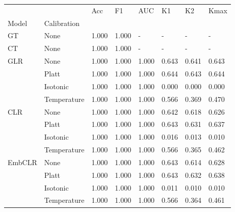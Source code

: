 \begin{tabular}{llllllll}
\toprule
 &  & Acc & F1 & AUC & K1 & K2 & Kmax \\
Model & Calibration &  &  &  &  &  &  \\
\midrule
GT & None & 1.000 & 1.000 & - & - & - & - \\
\cline{1-8}
CT & None & 1.000 & 1.000 & - & - & - & - \\
\cline{1-8}
\multirow[t]{4}{*}{GLR} & None & 1.000 & 1.000 & 1.000 & 0.643 & 0.641 & 0.643 \\
 & Platt & 1.000 & 1.000 & 1.000 & 0.644 & 0.643 & 0.644 \\
 & Isotonic & 1.000 & 1.000 & 1.000 & 0.000 & 0.000 & 0.000 \\
 & Temperature & 1.000 & 1.000 & 1.000 & 0.566 & 0.369 & 0.470 \\
\cline{1-8}
\multirow[t]{4}{*}{CLR} & None & 1.000 & 1.000 & 1.000 & 0.642 & 0.618 & 0.626 \\
 & Platt & 1.000 & 1.000 & 1.000 & 0.643 & 0.631 & 0.637 \\
 & Isotonic & 1.000 & 1.000 & 1.000 & 0.016 & 0.013 & 0.010 \\
 & Temperature & 1.000 & 1.000 & 1.000 & 0.566 & 0.365 & 0.462 \\
\cline{1-8}
\multirow[t]{4}{*}{EmbCLR} & None & 1.000 & 1.000 & 1.000 & 0.643 & 0.614 & 0.628 \\
 & Platt & 1.000 & 1.000 & 1.000 & 0.643 & 0.632 & 0.638 \\
 & Isotonic & 1.000 & 1.000 & 1.000 & 0.011 & 0.010 & 0.010 \\
 & Temperature & 1.000 & 1.000 & 1.000 & 0.566 & 0.364 & 0.461 \\
\cline{1-8}
\bottomrule
\end{tabular}
